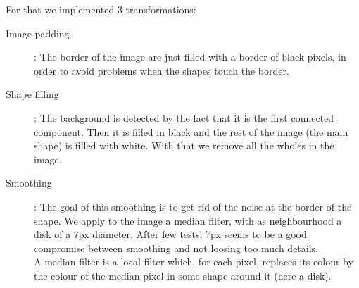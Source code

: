 \documentclass[12pt]{article}
\begin{document}
For that we implemented 3 transformations:
\begin{description}
	\item[Image padding]: The border of the image are just filled with a border of black pixels, in order to avoid problems when the shapes touch the border.
        \item[Shape filling]: The background is detected by the fact that it is the first connected component. Then it is filled in black and the rest of the image (the main shape) is filled with white. With that we remove all the wholes in the image.
        \item[Smoothing]: The goal of this smoothing is to get rid of the noise at the border of the shape. We apply to the image a median filter, with as neighbourhood a disk of a 7px diameter. After few tests, 7px seems to be a good compromise between smoothing and not loosing too much details. \\
        A median filter is a local filter which, for each pixel, replaces its colour by the colour of the median pixel in some shape around it (here a disk).
        

\end{description}
\end{document}
